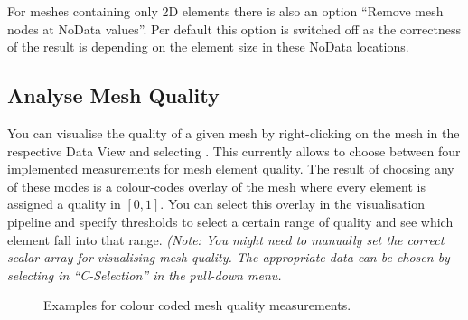 For meshes containing only 2D elements there is also an option ``Remove mesh nodes at NoData values''. Per default this option is switched off as the correctness of the result is depending on the element size in these NoData locations.


\subsection{Analyse Mesh Quality}

You can visualise the quality of a given mesh by right-clicking on the mesh in the respective Data View and selecting . This currently allows to choose between four implemented measurements for mesh element quality. The result of choosing any of these modes is a colour-codes overlay of the mesh where every element is assigned a quality in $[0,1]$. You can select this overlay in the visualisation pipeline and specify thresholds to select a certain range of quality and see which element fall into that range. \emph{(Note: You might need to manually set the correct scalar array for visualising mesh quality. The appropriate data can be chosen by selecting in ``C-Selection'' in the  pull-down menu.}

\begin{figure}[tb]
\begin{center}
\enspace
{}\enspace
{}
\end{center}
\caption{Examples for colour coded mesh quality measurements.} \label{fig:mshqual}
\end{figure}

